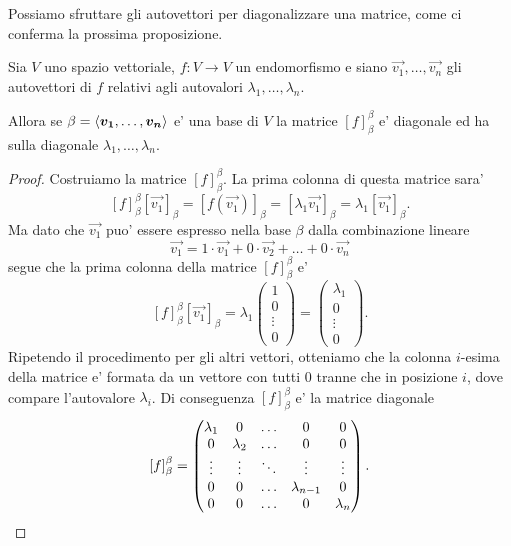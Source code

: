 Possiamo sfruttare gli autovettori per diagonalizzare una matrice, come ci conferma la prossima proposizione.

\begin{proposition}
    Sia $V$ uno spazio vettoriale, $f: V \to V$ un endomorfismo e siano $\vec{v_1}, \dots, \vec{v_n}$ gli autovettori di $f$ relativi agli autovalori $\lambda_1, \dots, \lambda_n$. 
    
    Allora se $\beta = \left\langle \bm{v_1}, \dots, \bm{v_n} \right\rangle$ e' una base di $V$ la matrice $[f]_{\beta}^{\beta}$ e' diagonale ed ha sulla diagonale $\lambda_1, \dots, \lambda_n$.
\end{proposition}
\begin{proof}
    Costruiamo la matrice $[f]_{\beta}^{\beta}$. La prima colonna di questa matrice sara' \[
        [f]_{\beta}^{\beta}[\vec{v_1}]_{\beta} = [f(\vec{v_1})]_{\beta} = [\lambda_1 \vec{v_1}]_{\beta} = \lambda_1 [\vec{v_1}]_{\beta}.
    \]
    Ma dato che $\vec{v_1}$ puo' essere espresso nella base $\beta$ dalla combinazione lineare \[
        \vec{v_1} = 1\cdot \vec{v_1} + 0 \cdot \vec{v_2} + \dots + 0 \cdot \vec{v_n}    
    \]
    segue che la prima colonna della matrice $[f]_{\beta}^{\beta}$ e' \[
        [f]_{\beta}^{\beta}[\vec{v_1}]_{\beta} = \lambda_1 \begin{pmatrix} 1 \\ 0 \\ \vdots \\ 0 \end{pmatrix} = \begin{pmatrix} \lambda_1 \\ 0 \\ \vdots \\ 0 \end{pmatrix}.
    \]
    Ripetendo il procedimento per gli altri vettori, otteniamo che la colonna $i$-esima della matrice e' formata da un vettore con tutti $0$ tranne che in posizione $i$, dove compare l'autovalore $\lambda_i$. Di conseguenza $[f]_{\beta}^{\beta}$ e' la matrice diagonale\[
        [f]_{\beta}^{\beta} = \begin{pmatrix}
            \lambda_1   & 0         & \dots  & 0             & 0 \\
            0           & \lambda_2 & \dots  & 0             & 0 \\
            \vdots      & \vdots    & \ddots & \vdots        & \vdots \\
            0           & 0         & \dots  & \lambda_{n-1} & 0 \\
            0           & 0         & \dots  & 0             & \lambda_n \\
        \end{pmatrix}. \qedhere
    \]
\end{proof}

